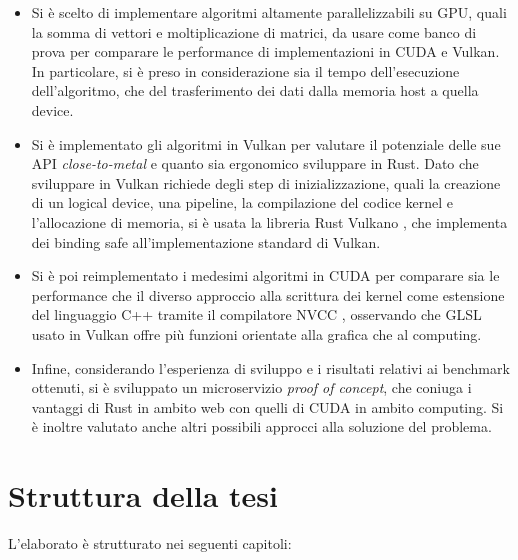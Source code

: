 \begin{itemize}
    \item Si è scelto di implementare algoritmi altamente parallelizzabili su \gls{GPU}, quali la somma di vettori e moltiplicazione di matrici, da usare come banco di prova per comparare le performance di implementazioni in \gls{CUDA} e Vulkan. In particolare, si è preso in considerazione sia il tempo dell'esecuzione dell'algoritmo, che del trasferimento dei dati dalla memoria host a quella device.
    \item Si è implementato gli algoritmi in Vulkan per valutare il potenziale delle sue \gls{API} \textit{close-to-metal} e quanto sia ergonomico sviluppare in Rust. Dato che sviluppare in Vulkan richiede degli step di inizializzazione, quali la creazione di un logical device, una pipeline, la compilazione del codice kernel e l'allocazione di memoria, si è usata la libreria Rust Vulkano \cite[]{Rust:Vulkano}, che implementa dei binding safe all'implementazione standard di Vulkan.
    \item Si è poi reimplementato i medesimi algoritmi in \gls{CUDA} per comparare sia le performance che il diverso approccio alla scrittura dei kernel come estensione del linguaggio C++ tramite il compilatore \gls{NVCC} \cite[]{NVIDIA:nvcc}, osservando che GLSL \cite[]{KG:GLSL} usato in Vulkan offre più funzioni orientate alla grafica che al computing.
    \item Infine, considerando l'esperienza di sviluppo e i risultati relativi ai benchmark ottenuti, si è sviluppato un microservizio \textit{proof of concept}, che coniuga i vantaggi di Rust in ambito web con quelli di \gls{CUDA} in ambito computing. Si è inoltre valutato anche altri possibili approcci alla soluzione del problema.
\end{itemize}



\section[Struttura della tesi]{Struttura della tesi}

L'elaborato è strutturato nei seguenti capitoli:

